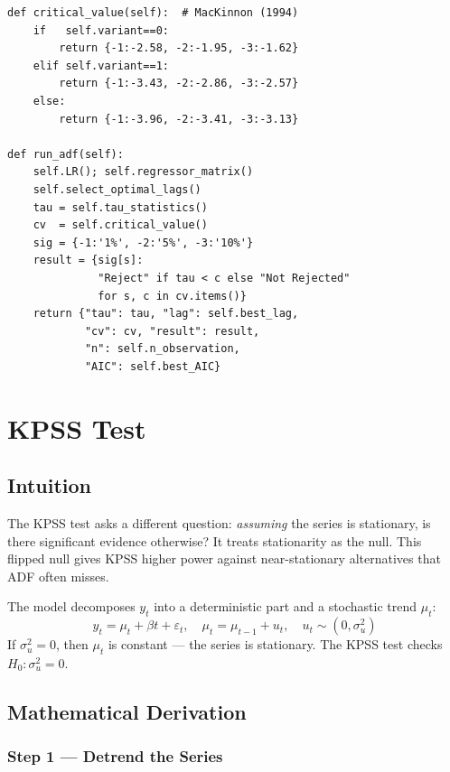 \documentclass[10pt,a4paper,twocolumn]{article}
\begin{document}
\begin{tcolorbox}[codebox={Step 7 --- Decision (Formula 7)}]
\begin{lstlisting}[style=pythonplain]
def critical_value(self):  # MacKinnon (1994)
    if   self.variant==0:
        return {-1:-2.58, -2:-1.95, -3:-1.62}
    elif self.variant==1:
        return {-1:-3.43, -2:-2.86, -3:-2.57}
    else:
        return {-1:-3.96, -2:-3.41, -3:-3.13}

def run_adf(self):
    self.LR(); self.regressor_matrix()
    self.select_optimal_lags()
    tau = self.tau_statistics()
    cv  = self.critical_value()
    sig = {-1:'1%', -2:'5%', -3:'10%'}
    result = {sig[s]:
              "Reject" if tau < c else "Not Rejected"
              for s, c in cv.items()}
    return {"tau": tau, "lag": self.best_lag,
            "cv": cv, "result": result,
            "n": self.n_observation,
            "AIC": self.best_AIC}
\end{lstlisting}
\end{tcolorbox}

\section{KPSS Test}

\subsection{Intuition}

The KPSS test asks a different question: \emph{assuming} the series
is stationary, is there significant evidence otherwise?  It treats
stationarity as the null.  This flipped null gives KPSS higher
power against near-stationary alternatives that ADF often misses.

The model decomposes $y_t$ into a deterministic part and a
stochastic trend $\mu_t$:
\[
  y_t = \mu_t + \beta t + \varepsilon_t,\quad
  \mu_t = \mu_{t-1} + u_t,\quad u_t\sim(0,\sigma^2_u)
\]
If $\sigma^2_u = 0$, then $\mu_t$ is constant --- the series is
stationary.  The KPSS test checks $H_0:\sigma^2_u=0$.

\subsection{Mathematical Derivation}

\subsubsection{Step 1 --- Detrend the Series}
\end{document}
